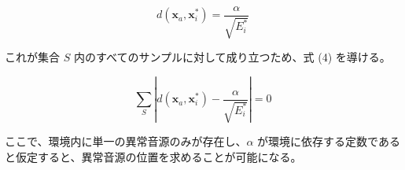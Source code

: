 \documentclass[../main]{subfiles}
\begin{document}
\begin{equation}
    d(\mathbf{x}_a, \mathbf{x}_i^*) = \frac{\alpha}{\sqrt{E_i^*}}
\end{equation}

これが集合 $S$ 内のすべてのサンプルに対して成り立つため、式 (4) を導ける。

\begin{equation}
    \sum_{S} \left| d(\mathbf{x}_a, \mathbf{x}_i^*) - \frac{\alpha}{\sqrt{E_i^*}} \right| = 0
\end{equation}

ここで、環境内に単一の異常音源のみが存在し、$\alpha$ が環境に依存する定数であると仮定すると、異常音源の位置を求めることが可能になる。
\end{document}
